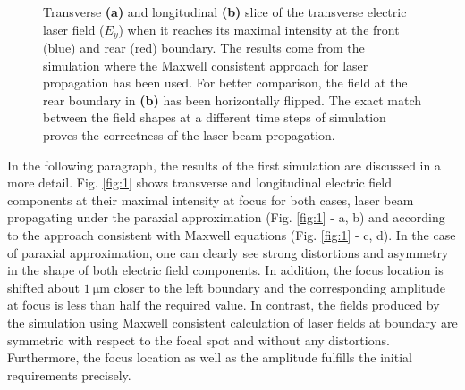 \begin{figure}[h!]
	\centering
	\hspace{1mm}
	\caption{Transverse \textbf{(a)} and longitudinal \textbf{(b)} slice of the transverse electric laser field ($ E_{y} $) when it reaches its maximal intensity at the front (blue) and rear (red) boundary. The results come from the simulation where the Maxwell consistent approach for laser propagation has been used. For better comparison, the field at the rear boundary in \textbf{(b)} has been horizontally flipped. The exact match between the field shapes at a different time steps of simulation proves the correctness of the laser beam propagation.}
	\label{fig:4}
\end{figure}

In the following paragraph, the results of the first simulation are discussed in a more detail. Fig. \ref{fig:1} shows transverse and longitudinal electric field components at their maximal intensity at focus for both cases, laser beam propagating under the paraxial approximation (Fig. \ref{fig:1} - a, b) and according to the approach consistent with Maxwell equations (Fig. \ref{fig:1} - c, d). In the case of paraxial approximation, one can clearly see strong distortions and asymmetry in the shape of both electric field components. In addition, the focus location is shifted about $ 1 \: \mathrm{\mu m} $ closer to the left boundary and the corresponding amplitude at focus is less than half the required value. In contrast, the fields produced by the simulation using Maxwell consistent calculation of laser fields at boundary are symmetric with respect to the focal spot and without any distortions. Furthermore, the focus location as well as the amplitude fulfills the initial requirements precisely.

